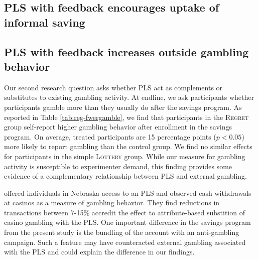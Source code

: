\documentclass[11pt]{article}
\begin{document}


	\subsection{PLS with feedback encourages uptake of informal saving}


		

	\subsection{PLS with feedback increases outside gambling behavior}

		Our second research question asks whether PLS act as complements or substitutes to existing gambling activity. At endline, we ask participants whether participants gamble more than they usually do after the savings program. As reported in Table \ref{tab:reg-fwergamble}, we find that participants in the \textsc{Regret} group self-report higher gambling behavior after enrollment in the savings program. On average, treated participants are 15 percentage points ($p < 0.05$) more likely to report gambling than the control group. We find no similar effects for participants in the simple \textsc{Lottery} group. While our measure for gambling activity is susceptible to experimenter demand, this finding provides some evidence of a complementary relationship between PLS and external gambling.

		 offered individuals in Nebraska access to an PLS and observed cash withdrawals at casinos as a measure of gambling behavior. They find reductions in transactions between 7-15\% accredit the effect to attribute-based substition of casino gambling with the PLS. One important difference in the savings program from the present study is the bundling of the account with an anti-gambling campaign. Such a feature may have counteracted external gambling associated with the PLS and could explain the difference in our findings.
\end{document}
